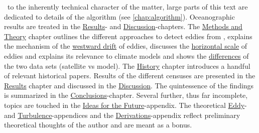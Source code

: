 ~to the inherently technical character of the matter, large parts of this text are dedicated to details of the algorithm (see \cref{chap:algorithm}). Oceanographic results are treated in the \href{chap:results}{Results}- and \href{chap:discussion}{Discussion}-chapters. The \href{chap:THEORY}{Methods and Theory} chapter outlines the different approaches to detect eddies from \SSH, explains the mechanism of the \href{subsec:speeds}{westward drift} of eddies, discusses the \href{subsec:horScales}{horizontal scale} of eddies and explains its relevance to climate models and shows the \href{sec:satvsmod}{differences} of the two data sets (satellite vs model).
The \href{chap:history}{History} chapter introduces a handful of relevant historical papers.
Results of the different censuses are presented in the \href{chap:results}{Results} chapter and discussed in the \href{chap:discussion}{Discussion}. The quintessence of the findings is summarized in the \href{chap:conclusion}{Conclusions}-chapter. Several further, thus far incomplete, topics are touched in the \href{appendix:futureTopics}{Ideas for the Future}-appendix. The theoretical \href{appendix:eddy_cat}{Eddy}- and \href{appendix:eddy_cat}{Turbulence}-appendices and the \href{appendix:derivations}{Derivations}-appendix reflect preliminary theoretical thoughts of the author and are meant as a bonus.


